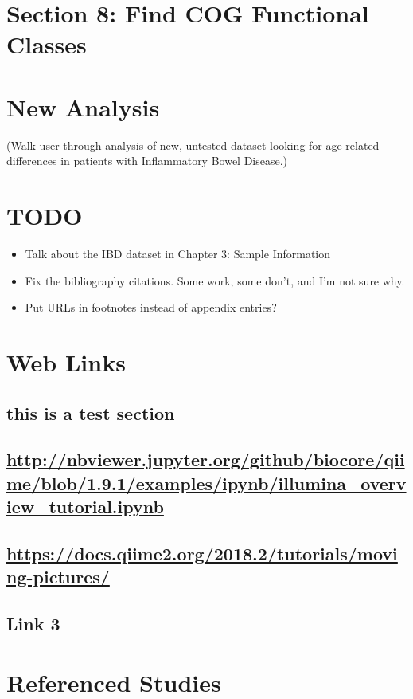 \chapter{Section 8: Find COG Functional Classes}

\chapter{New Analysis}
(Walk user through analysis of new, untested dataset looking for age-related differences in patients with Inflammatory Bowel Disease.)

\chapter{TODO}
\begin{itemize}
    \item Talk about the IBD dataset in Chapter 3: Sample Information
    \item Fix the bibliography citations. Some work, some don't, and I'm not sure why.
    \item Put URLs in footnotes instead of appendix entries?
\end{itemize}

%
\begin{appendix}
\chapter{Web Links}
    \section{this is a test section}
    \label{test-label}
    \section{\url{http://nbviewer.jupyter.org/github/biocore/qiime/blob/1.9.1/examples/ipynb/illumina_overview_tutorial.ipynb}}
    \label{appendix:IlluminaOverTut}
    \section{\url{https://docs.qiime2.org/2018.2/tutorials/moving-pictures/}}
    \label{appendix:MovingPicTut}
    \section*{Link 3}

\chapter{Referenced Studies}
\end{appendix}
%

%


